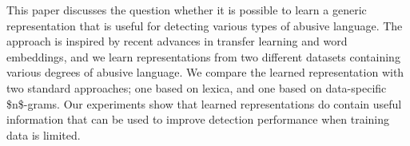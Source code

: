 This paper discusses the question whether it is possible to learn a generic representation that is useful for detecting various types of abusive language. The approach is inspired by recent advances in transfer learning and word embeddings, and we learn representations from two different datasets containing various degrees of abusive language. We compare the learned representation with two standard approaches; one based on lexica, and one based on data-specific \$n\$-grams. Our experiments show that learned representations do contain useful information that can be used to improve detection performance when training data is limited.
